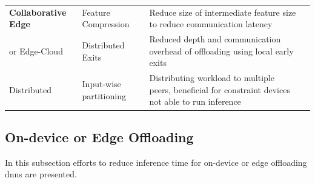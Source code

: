 \begin{minipage}[t]{\linewidth}
\begin{footnotesize}
\begin{longtabu}{>{\bfseries}X[c]|X[l]|X[3l]|X[c]}
	Collaborative Edge  & Feature Compression & Reduce size of intermediate feature size to reduce communication latency%
	& \cite{kang_neurosurgeon:_2017,choi_near-lossless_2018, choi_deep_2018, eshratifar_bottlenet:_2019} \tabularnewline
	
	or Edge-Cloud & Distributed Exits & Reduced depth and communication overhead of offloading using local early exits%
	& \cite{leroux_cascading_2017,teerapittayanon_distributed_2017, li_edge_2018} \tabularnewline\hline
	
	Distributed & Input-wise partitioning & Distributing workload to multiple peers, beneficial for constraint devices not able to run inference%
	& \cite{mao_modnn:_2017, zhao_deepthings:_2018}
	\tabularnewline

	\bottomrule
\end{longtabu}
\end{footnotesize}
\end{minipage}

\subsection{On-device or Edge Offloading}

In this subsection efforts to reduce inference time for on-device or edge offloading \gls{dnn}s are presented.

